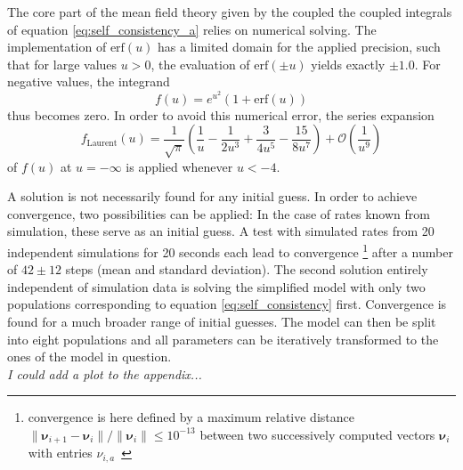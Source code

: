 The core part of the mean field theory given by the coupled the 
coupled integrals of equation \eqref{eq:self_consistency_a} relies on numerical
solving. The implementation of $\text{erf}(u)$ has a limited domain for the applied 
precision, such that for large values $u > 0$, the evaluation of 
$\text{erf}(\pm u)$ yields exactly $\pm 1.0$. For negative values, the integrand 
\begin{equation}
    f(u) = e^{u^2} \left(1 + \text{erf}(u)\right)
    \label{eq:integrand}
\end{equation}
thus becomes zero. In order to avoid this 
numerical error, the series expansion 
\begin{equation}
    f_\text{Laurent}(u) = 
        \frac{1}{\sqrt{\pi}} 
        \left( \frac{1}{u} - \frac{1}{2u^3} + \frac{3}{4u^5} - \frac{15}{8u^7} \right) +  
        \mathcal{O}\left( \frac{1}{u^9} \right) 
    \label{eq:expand_integrand}
\end{equation}
of $f(u)$ at $u = -\infty$ is applied whenever $u < -4$. 

A solution is not necessarily found for any initial guess. In order to achieve convergence, two possibilities 
can be applied: In the case of rates known from simulation, these serve as an initial guess. 
A test with simulated rates from 20 independent simulations for 20 seconds each lead to convergence%
\footnote{convergence is here defined by a maximum relative distance 
    $\|\boldsymbol\nu_{i + 1} - \boldsymbol\nu_i\| / \|\boldsymbol\nu_i\| \le 10^{-13}$ between two 
    successively computed vectors $\boldsymbol\nu_i$ with entries $\nu_{i, a}$~\cite{scipy}} %
after a number of $42 \pm 12$ steps (mean and standard deviation). 
The second solution entirely independent of simulation data is solving the simplified model 
with only two populations corresponding to equation \eqref{eq:self_consistency} first.
Convergence is found for a much broader range of initial guesses. The model can then be split 
into eight populations and all parameters can be iteratively transformed to the ones of the 
model in question. 
\\\emph{I could add a plot to the appendix...}

